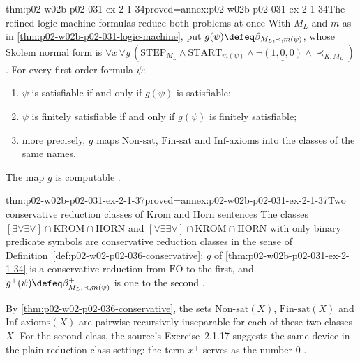 \begin{hbcorollary}{thm:p02-w02b-p02-031-ex-2-1-34}{proved=annex:p02-w02b-p02-031-ex-2-1-34}{The refined logic-machine formulas reduce both problems at once}
With \(M_L\) and \(m\) as in \cref{thm:p02-w02b-p02-031-logic-machine}, put
\(g(\psi)\defeq\beta_{M_L,\prec,m(\psi)}\), whose Skolem normal form is
\(\forall x\,\forall y\,(\mathrm{STEP}_{M_L}\land\mathrm{START}_{m(\psi)}\land
\neg\underline{(1,0,0)}\land\prec_{K,M_L})\).  For every first-order formula
\(\psi\):
\begin{enumerate}
\item \(\psi\) is satisfiable if and only if \(g(\psi)\) is satisfiable;
\item \(\psi\) is finitely satisfiable if and only if \(g(\psi)\) is finitely
      satisfiable;
\item more precisely, \(g\) maps \(\mathrm{Non\text{-}sat}\),
      \(\mathrm{Fin\text{-}sat}\) and \(\mathrm{Inf\text{-}axioms}\) into the
      classes of the same names.
\end{enumerate}
The map \(g\) is computable \cite[Sect.~2.1.2, Exercise~2.1.34]{BorgerGradelGurevich1997}.
\end{hbcorollary}

\begin{hbcorollary}{thm:p02-w02b-p02-031-ex-2-1-37}{proved=annex:p02-w02b-p02-031-ex-2-1-37}{Two conservative reduction classes of Krom and Horn sentences}
The classes \([\exists\forall\exists\forall]\cap\mathrm{KROM}\cap
\mathrm{HORN}\) and \([\forall\exists\exists\forall]\cap\mathrm{KROM}\cap
\mathrm{HORN}\) with only binary predicate symbols are conservative reduction
classes in the sense of Definition~\ref{def:p02-w02-p02-036-conservative}:
\(g\) of \cref{thm:p02-w02b-p02-031-ex-2-1-34} is a conservative reduction from
\(\mathrm{FO}\) to the first, and
\(g^{+}(\psi)\defeq\beta^{+}_{M_L,\prec,m(\psi)}\) is one to the second
\cite[Sect.~2.1.2, Exercise~2.1.37]{BorgerGradelGurevich1997}.
\end{hbcorollary}

By \cref{thm:p02-w02-p02-036-conservative}, the sets
\(\mathrm{Non\text{-}sat}(X)\), \(\mathrm{Fin\text{-}sat}(X)\) and
\(\mathrm{Inf\text{-}axioms}(X)\) are pairwise recursively inseparable for
each of these two classes \(X\).  For the second class, the source's
Exercise~2.1.17 suggests the same device in the plain reduction-class setting:
the term \(x^{+}\) serves as the number \(0\)
\cite[Sect.~2.1.1, p.~29]{BorgerGradelGurevich1997}.


